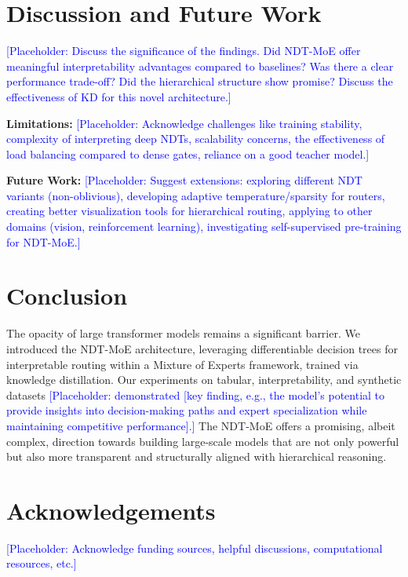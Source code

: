 \documentclass[11pt,a4paper]{article}
\newcommand{\placeholder}[1]{\textcolor{blue}{[Placeholder: #1]}}
\begin{document}
\section{Discussion and Future Work}
\label{sec:discussion}
\placeholder{Discuss the significance of the findings. Did NDT-MoE offer meaningful interpretability advantages compared to baselines? Was there a clear performance trade-off? Did the hierarchical structure show promise? Discuss the effectiveness of KD for this novel architecture.}

\textbf{Limitations:} \placeholder{Acknowledge challenges like training stability, complexity of interpreting deep NDTs, scalability concerns, the effectiveness of load balancing compared to dense gates, reliance on a good teacher model.}

\textbf{Future Work:} \placeholder{Suggest extensions: exploring different NDT variants (non-oblivious), developing adaptive temperature/sparsity for routers, creating better visualization tools for hierarchical routing, applying to other domains (vision, reinforcement learning), investigating self-supervised pre-training for NDT-MoE.}

\section{Conclusion}
\label{sec:conclusion}
The opacity of large transformer models remains a significant barrier. We introduced the NDT-MoE architecture, leveraging differentiable decision trees for interpretable routing within a Mixture of Experts framework, trained via knowledge distillation. Our experiments on tabular, interpretability, and synthetic datasets \placeholder{demonstrated [key finding, e.g., the model's potential to provide insights into decision-making paths and expert specialization while maintaining competitive performance].} The NDT-MoE offers a promising, albeit complex, direction towards building large-scale models that are not only powerful but also more transparent and structurally aligned with hierarchical reasoning.

\section*{Acknowledgements}
\placeholder{Acknowledge funding sources, helpful discussions, computational resources, etc.}

\end{document}
